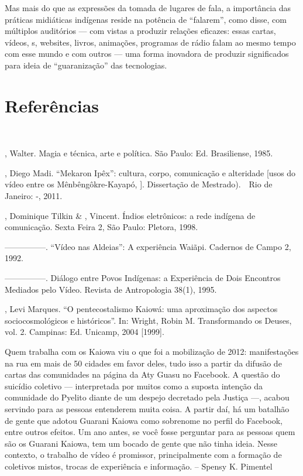 Mas mais do que as expressões da tomada de lugares de fala, a
importância das práticas midiáticas indígenas reside na potência de
``falarem'', como disse, com múltiplos auditórios --- com vistas a produzir
relações eficazes: essas cartas, vídeos, s, websites, livros,
animações, programas de rádio falam ao mesmo tempo com esse mundo e com
outros --- uma forma inovadora de produzir significados para ideia de
``guaranização'' das tecnologias.

\section{Referências}\ \  \ \ 

\begin{Parskip}
, Walter. Magia e técnica, arte e política. São Paulo: Ed.
Brasiliense, 1985.

, Diego Madi. ``Mekaron Ipêx'': cultura, corpo, comunicação e
alteridade [usos do vídeo entre os Mênbêngôkre-Kayapó, ]. Dissertação
de Mestrado).\ \ Rio de Janeiro: -, 2011. 

, Dominique Tilkin \& , Vincent. Índios eletrônicos: a
rede indígena de comunicação.  Sexta Feira 2, São Paulo: Pletora, 1998.


—————. ``Vídeo nas Aldeias'': A experiência Waiãpi. Cadernos de Campo 2,
1992.

—————. Diálogo entre Povos Indígenas: a Experiência de Dois Encontros
Mediados pelo Vídeo. Revista de Antropologia 38(1), 1995.

, Levi Marques. ``O pentecostalismo Kaiowá: uma aproximação dos
aspectos sociocosmológicos e históricos''. In: Wright, Robin M.
Transformando os Deuses, vol. 2. Campinas: Ed. Unicamp, 2004 [1999].
\end{Parskip}

Quem trabalha com os Kaiowa viu o que foi a mobilização de 2012:
manifestações na rua em mais de 50 cidades em favor deles, tudo isso a
partir da difusão de cartas das comunidades na página da Aty Guasu no
Facebook. A questão do suicídio coletivo --- interpretada por muitos como
a suposta intenção da comunidade do Pyelito diante de um despejo
decretado pela Justiça ---, acabou servindo para as pessoas entenderem
muita coisa. A partir daí, há um batalhão de gente que adotou Guarani
Kaiowa como sobrenome no perfil do Facebook, entre outros efeitos. Um
ano antes, se você fosse perguntar para as pessoas quem são os Guarani
Kaiowa, tem um bocado de gente que não tinha ideia. Nesse contexto, o
trabalho de vídeo é promissor, principalmente com a formação de
coletivos mistos, trocas de experiência e informação. – Spensy K.
Pimentel 

